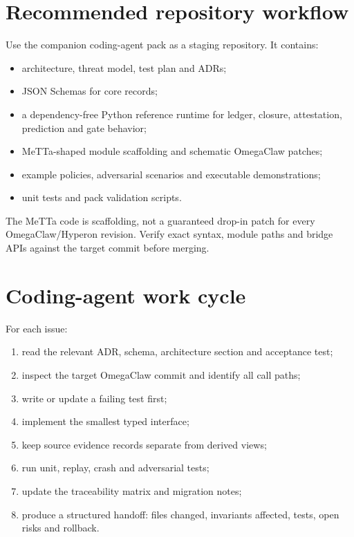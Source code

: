 \documentclass[11pt,oneside]{report}
\begin{document}
\section{Recommended repository workflow}

Use the companion coding-agent pack as a staging repository. It contains:

\begin{itemize}
  \item architecture, threat model, test plan and ADRs;
  \item JSON Schemas for core records;
  \item a dependency-free Python reference runtime for ledger, closure, attestation, prediction and gate behavior;
  \item MeTTa-shaped module scaffolding and schematic OmegaClaw patches;
  \item example policies, adversarial scenarios and executable demonstrations;
  \item unit tests and pack validation scripts.
\end{itemize}

The MeTTa code is scaffolding, not a guaranteed drop-in patch for every OmegaClaw/Hyperon revision. Verify exact syntax, module paths and bridge APIs against the target commit before merging.

\section{Coding-agent work cycle}

For each issue:

\begin{enumerate}
  \item read the relevant ADR, schema, architecture section and acceptance test;
  \item inspect the target OmegaClaw commit and identify all call paths;
  \item write or update a failing test first;
  \item implement the smallest typed interface;
  \item keep source evidence records separate from derived views;
  \item run unit, replay, crash and adversarial tests;
  \item update the traceability matrix and migration notes;
  \item produce a structured handoff: files changed, invariants affected, tests, open risks and rollback.
\end{enumerate}
\end{document}
